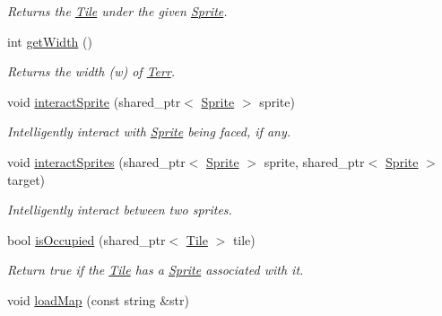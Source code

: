 \begin{DoxyCompactItemize}
\begin{DoxyCompactList}\small\item\em Returns the \hyperlink{class_tile}{Tile} under the given \hyperlink{class_sprite}{Sprite}. \end{DoxyCompactList}\item 
int \hyperlink{class_terr_a397fdbbeb3fe3eb8989d9da77af42f57}{get\+Width} ()\hypertarget{class_terr_a397fdbbeb3fe3eb8989d9da77af42f57}{}\label{class_terr_a397fdbbeb3fe3eb8989d9da77af42f57}

\begin{DoxyCompactList}\small\item\em Returns the width (w) of \hyperlink{class_terr}{Terr}. \end{DoxyCompactList}\item 
void \hyperlink{class_terr_ac900225f790f49a5baa490351adfb03a}{interact\+Sprite} (shared\+\_\+ptr$<$ \hyperlink{class_sprite}{Sprite} $>$ sprite)\hypertarget{class_terr_ac900225f790f49a5baa490351adfb03a}{}\label{class_terr_ac900225f790f49a5baa490351adfb03a}

\begin{DoxyCompactList}\small\item\em Intelligently interact with \hyperlink{class_sprite}{Sprite} being faced, if any. \end{DoxyCompactList}\item 
void \hyperlink{class_terr_a343cd63b0fd20a5baf2dbbf8ea1d7098}{interact\+Sprites} (shared\+\_\+ptr$<$ \hyperlink{class_sprite}{Sprite} $>$ sprite, shared\+\_\+ptr$<$ \hyperlink{class_sprite}{Sprite} $>$ target)\hypertarget{class_terr_a343cd63b0fd20a5baf2dbbf8ea1d7098}{}\label{class_terr_a343cd63b0fd20a5baf2dbbf8ea1d7098}

\begin{DoxyCompactList}\small\item\em Intelligently interact between two sprites. \end{DoxyCompactList}\item 
bool \hyperlink{class_terr_a367ee972d1e3edffe329fb4f7c84ff3e}{is\+Occupied} (shared\+\_\+ptr$<$ \hyperlink{class_tile}{Tile} $>$ tile)\hypertarget{class_terr_a367ee972d1e3edffe329fb4f7c84ff3e}{}\label{class_terr_a367ee972d1e3edffe329fb4f7c84ff3e}

\begin{DoxyCompactList}\small\item\em Return true if the \hyperlink{class_tile}{Tile} has a \hyperlink{class_sprite}{Sprite} associated with it. \end{DoxyCompactList}\item 
void \hyperlink{class_terr_af53f4fdf0e1605b1536bde8c3fb77c9d}{load\+Map} (const string \&str)\hypertarget{class_terr_af53f4fdf0e1605b1536bde8c3fb77c9d}{}\label{class_terr_af53f4fdf0e1605b1536bde8c3fb77c9d}


\end{DoxyCompactItemize}
